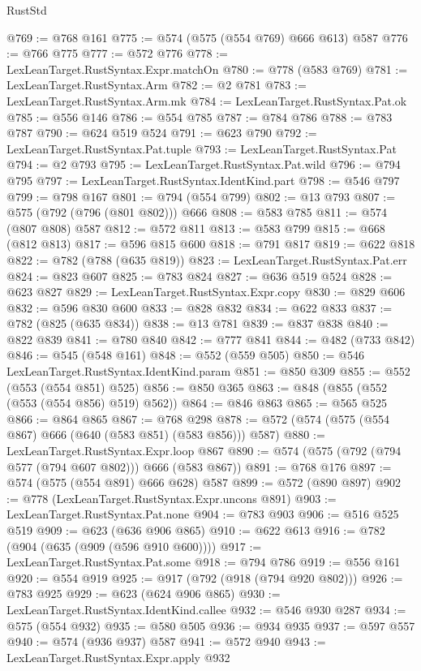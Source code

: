 \begin{lexlean}{RustStd}
\begin{coremodule}
@769 := @768 @161
@775 := @574 (@575 (@554 @769) @666 @613) @587
@776 := @766 @775
@777 := @572 @776
@778 := LexLeanTarget.RustSyntax.Expr.matchOn
@780 := @778 (@583 @769)
@781 := LexLeanTarget.RustSyntax.Arm
@782 := @2 @781
@783 := LexLeanTarget.RustSyntax.Arm.mk
@784 := LexLeanTarget.RustSyntax.Pat.ok
@785 := @556 @146
@786 := @554 @785
@787 := @784 @786
@788 := @783 @787
@790 := @624 @519 @524
@791 := @623 @790
@792 := LexLeanTarget.RustSyntax.Pat.tuple
@793 := LexLeanTarget.RustSyntax.Pat
@794 := @2 @793
@795 := LexLeanTarget.RustSyntax.Pat.wild
@796 := @794 @795
@797 := LexLeanTarget.RustSyntax.IdentKind.part
@798 := @546 @797
@799 := @798 @167
@801 := @794 (@554 @799)
@802 := @13 @793
@807 := @575 (@792 (@796 (@801 @802))) @666
@808 := @583 @785
@811 := @574 (@807 @808) @587
@812 := @572 @811
@813 := @583 @799
@815 := @668 (@812 @813)
@817 := @596 @815 @600
@818 := @791 @817
@819 := @622 @818
@822 := @782 (@788 (@635 @819))
@823 := LexLeanTarget.RustSyntax.Pat.err
@824 := @823 @607
@825 := @783 @824
@827 := @636 @519 @524
@828 := @623 @827
@829 := LexLeanTarget.RustSyntax.Expr.copy
@830 := @829 @606
@832 := @596 @830 @600
@833 := @828 @832
@834 := @622 @833
@837 := @782 (@825 (@635 @834))
@838 := @13 @781
@839 := @837 @838
@840 := @822 @839
@841 := @780 @840
@842 := @777 @841
@844 := @482 (@733 @842)
@846 := @545 (@548 @161)
@848 := @552 (@559 @505)
@850 := @546 LexLeanTarget.RustSyntax.IdentKind.param
@851 := @850 @309
@855 := @552 (@553 (@554 @851) @525)
@856 := @850 @365
@863 := @848 (@855 (@552 (@553 (@554 @856) @519) @562))
@864 := @846 @863
@865 := @565 @525
@866 := @864 @865
@867 := @768 @298
@878 := @572 (@574 (@575 (@554 @867) @666 (@640 (@583 @851) (@583 @856))) @587)
@880 := LexLeanTarget.RustSyntax.Expr.loop @867
@890 := @574 (@575 (@792 (@794 @577 (@794 @607 @802))) @666 (@583 @867))
@891 := @768 @176
@897 := @574 (@575 (@554 @891) @666 @628) @587
@899 := @572 (@890 @897)
@902 := @778 (LexLeanTarget.RustSyntax.Expr.uncons @891)
@903 := LexLeanTarget.RustSyntax.Pat.none
@904 := @783 @903
@906 := @516 @525 @519
@909 := @623 (@636 @906 @865)
@910 := @622 @613
@916 := @782 (@904 (@635 (@909 (@596 @910 @600))))
@917 := LexLeanTarget.RustSyntax.Pat.some
@918 := @794 @786
@919 := @556 @161
@920 := @554 @919
@925 := @917 (@792 (@918 (@794 @920 @802)))
@926 := @783 @925
@929 := @623 (@624 @906 @865)
@930 := LexLeanTarget.RustSyntax.IdentKind.callee
@932 := @546 @930 @287
@934 := @575 (@554 @932)
@935 := @580 @505
@936 := @934 @935
@937 := @597 @557
@940 := @574 (@936 @937) @587
@941 := @572 @940
@943 := LexLeanTarget.RustSyntax.Expr.apply @932

\end{coremodule}
\end{lexlean}
